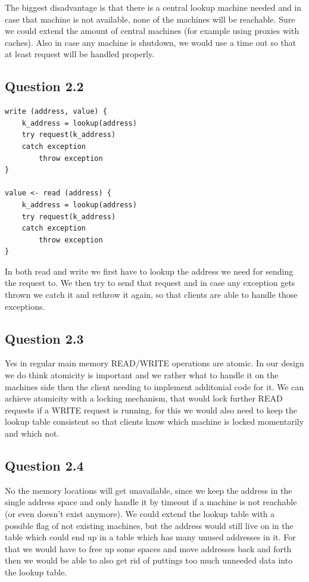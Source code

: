 \documentclass[12pt,a4paper]{article}
\begin{document}
The biggest disadvantage is that there is a central lookup machine needed and in case that machine is not available, none of the machines will be reachable.
Sure we could extend the amount of central machines (for example using proxies with caches).
Also in case any machine is shutdown, we would use a time out so that at least request will be handled properly.

\subsection{Question 2.2}

\begin{verbatim}
write (address, value) {
	k_address = lookup(address)
	try request(k_address)
	catch exception
		throw exception
}

value <- read (address) {
	k_address = lookup(address)
	try request(k_address)
	catch exception
		throw exception
}
\end{verbatim}

In both read and write we first have to lookup the address we need for sending the request to. We then try to send that request and in case any exception gets thrown we catch it and rethrow it again, so that clients are able to handle those exceptions.

\subsection{Question 2.3}
Yes in regular main memory READ/WRITE operations are atomic.
In our design we do think atomicity is important and we rather what to handle it on the machines side then the client needing to implement additonial code for it.
We can achieve atomicity with a locking mechanism, that would lock further READ requests if a WRITE request is running, for this we would also need to keep the lookup table consistent so that clients know which machine is locked momentarily and which not.

\subsection{Question 2.4}
No the memory locations will get unavailable, since we keep the address in the single address space and only handle it by timeout if a machine is not reachable (or even doesn't exist anymore).
We could extend the lookup table with a possible flag of not existing machines, but the address would still live on in the table which could end up in a table which has many unused addresses in it.
For that we would have to free up some spaces and move addresses back and forth then we would be able to also get rid of puttings too much unneeded data into the lookup table.
\end{document}
